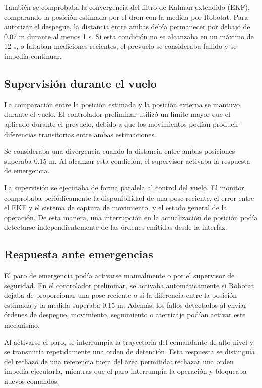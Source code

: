 También se comprobaba la convergencia del filtro de Kalman extendido (EKF), comparando la posición estimada por el dron con la medida por Robotat. Para autorizar el despegue, la distancia entre ambas debía permanecer por debajo de 0.07 m durante al menos 1 s. Si esta condición no se alcanzaba en un máximo de 12 s, o faltaban mediciones recientes, el prevuelo se consideraba fallido y se impedía continuar.

\subsection{Supervisión durante el vuelo}

La comparación entre la posición estimada y la posición externa se mantuvo durante el vuelo. El controlador preliminar utilizó un límite mayor que el aplicado durante el prevuelo, debido a que los movimientos podían producir diferencias transitorias entre ambas estimaciones.

Se consideraba una divergencia cuando la distancia entre ambas posiciones superaba 0.15 m. Al alcanzar esta condición, el supervisor activaba la respuesta de emergencia.

La supervisión se ejecutaba de forma paralela al control del vuelo. El monitor comprobaba periódicamente la disponibilidad de una pose reciente, el error entre el EKF y el sistema de captura de movimiento, y el estado general de la operación. De esta manera, una interrupción en la actualización de posición podía detectarse independientemente de las órdenes emitidas desde la interfaz.

\subsection{Respuesta ante emergencias}

El paro de emergencia podía activarse manualmente o por el supervisor de seguridad. En el controlador preliminar, se activaba automáticamente si Robotat dejaba de proporcionar una pose reciente o si la diferencia entre la posición estimada y la medida superaba 0.15 m. Además, los fallos detectados al enviar órdenes de despegue, movimiento, seguimiento o aterrizaje podían activar este mecanismo.

Al activarse el paro, se interrumpía la trayectoria del comandante de alto nivel y se transmitía repetidamente una orden de detención. Esta respuesta se distinguía del rechazo de una referencia fuera del área permitida: rechazar una orden impedía ejecutarla, mientras que el paro interrumpía la operación y bloqueaba nuevos comandos.

